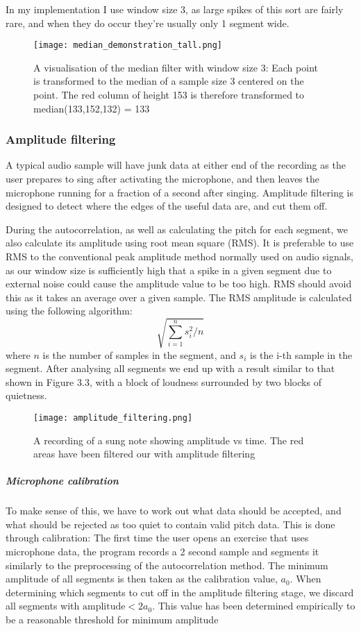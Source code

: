 In my implementation I use window size 3, as large spikes of this sort are fairly rare, and when they do occur they're usually only 1 segment wide.

\begin{figure}
	\centering
    \texttt{[image: median\_demonstration\_tall.png]}
	\caption{A visualisation of the median filter with window size 3: Each point is transformed to the median of a sample size 3 centered on the point. The red column of height 153 is therefore transformed to median(133,152,132) = 133}
\end{figure}


\subsubsection{Amplitude filtering}
A typical audio sample will have junk data at either end of the recording as the user prepares to sing after activating the microphone, and then leaves the microphone running for a fraction of a second after singing. Amplitude filtering is designed to detect where the edges of the useful data are, and cut them off.

During the autocorrelation, as well as calculating the pitch for each segment, we also calculate its amplitude using root mean square (RMS). It is preferable to use RMS to the conventional peak amplitude method normally used on audio signals, as our window size is sufficiently high that a spike in a given segment due to external noise could cause the amplitude value to be too high. RMS should avoid this as it takes an average over a given sample. The RMS amplitude is calculated using the following algorithm:
 \[\sqrt{\sum_{i=1}^{n} s_i^2/n}\] where \(n\) is the number of samples in the segment, and \(s_i\) is the i-th sample in the segment. After analysing all segments we end up with a result similar to that shown in Figure 3.3, with a block of loudness surrounded by two blocks of quietness.
 
\begin{figure}
	\centering
    \texttt{[image: amplitude\_filtering.png]}
	\caption{A recording of a sung note showing amplitude vs time. The red areas have been filtered our with amplitude filtering}
\end{figure}


\subparagraph{Microphone calibration}
To make sense of this, we have to work out what data should be accepted, and what should be rejected as too quiet to contain valid pitch data. This is done through calibration: The first time the user opens an exercise that uses microphone data, the program records a 2 second sample and segments it similarly to the preprocessing of the autocorrelation method. The minimum amplitude of all segments is then taken as the calibration value, \(a_0\).
When determining which segments to cut off in the amplitude filtering stage, we discard all segments with \(\text{amplitude} < 2a_0\). This value has been determined empirically to be a reasonable threshold for minimum amplitude

